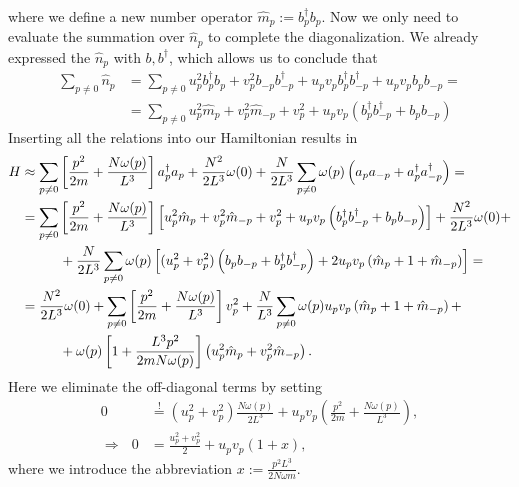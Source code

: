 \documentclass[english, parskip=full]{scrartcl}
\newcommand{\kla}{}
\newcommand{\klam}{}
\def\I{\text{i}}
\begin{document}
where we define a new number operator $\hat{m}_p:=b_p^\dagger b_p$.
Now we only need to evaluate the summation over $\hat{n}_p$ to complete the diagonalization.
We already expressed the $\hat{n}_p$ with $b,b^\dagger$, which allows us to conclude that
\begin{align}
\sum_{p\neq 0}\hat{n}_p&=\sum_{p\neq 0}u_p^2b_p^\dagger b_p +v_p^2b_{-p}b_{-p}^\dagger +u_pv_pb_p^\dagger b_{-p}^\dagger + u_pv_pb_pb_{-p}=\\
&=\sum_{p\neq 0}u_p^2\hat{m}_p+v_p^2\hat{m}_{-p} +v_p^2+u_pv_p\kla\left( {b_p^\dagger b_{-p}^\dagger +b_pb_{-p}} \right)
\end{align}
Inserting all the relations into our Hamiltonian results in
\begin{align}
H&\approx\sum_{p\neq 0}\klam\left[ {\frac{p^2}{2m}+\frac{N\omega (p)}{L^3}} \right]a_p^\dagger a_p+\frac{N^2}{2L^3}\omega (0)+\frac{N}{2L^3}\sum_{p\neq 0}\omega (p) \kla\left( {a_pa_{-p} + a_p^\dagger a_{-p}^\dagger} \right)=\\
&=\sum_{p\neq 0}\klam\left[ {\frac{p^2}{2m}+\frac{N\omega (p)}{L^3}} \right]\klam\left[ {u_p^2\hat{m}_p+v_p^2\hat{m}_{-p} + v_p^2+u_pv_p\kla\left( {b_p^\dagger b_{-p}^\dagger +b_pb_{-p}} \right)} \right]+\frac{N^2}{2L^3}\omega (0)+\\
&\hspace*{1cm} +\frac{N}{2L^3}\sum_{p\neq 0}\omega (p) \klam\left[ {(u_p^2+v_p^2)\kla\left( {b_pb_{-p} + b_p^\dagger b_{-p}^\dagger} \right) + 2u_pv_p\kla\left( {\hat{m}_p+1+\hat{m}_{-p}} \right)} \right]=\\
&=\frac{N^2}{2L^3}\omega (0)+\sum_{p\neq 0}\klam\left[ {\frac{p^2}{2m}+\frac{N\omega (p)}{L^3}} \right]v_p^2+\frac{N}{L^3}\sum_{p\neq 0}\omega (p)u_pv_p\kla\left( {\hat{m}_p+1+\hat{m}_{-p}} \right)+\\
&\hspace*{1cm} +\omega (p)\klam\left[ {1+\frac{L^3p^2}{2mN\omega (p)}} \right]\kla\left( {u_p^2\hat{m}_p+v_p^2\hat{m}_{-p}} \right) .
\end{align}
Here we eliminate the off-diagonal terms by setting
\begin{align}
0&\overset{!}{=}(u_p^2+v_p^2)\frac{N\omega (p)}{2L^3}+u_pv_p\kla\left( {\frac{p^2}{2m}+\frac{N\omega (p)}{L^3}} \right),\\
\Rightarrow\ \ \ 0&=\frac{u_p^2+v_p^2}{2}+u_pv_p(1+x),
\end{align}
where we introduce the abbreviation $x:=\frac{p^2L^3}{2N\omega m}$.
\end{document}
